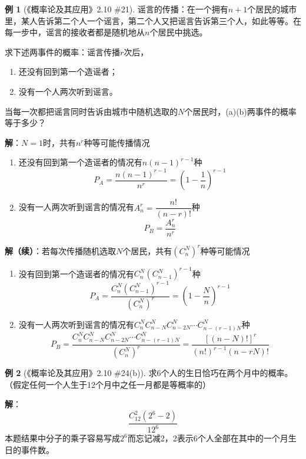 \documentclass[11pt,a4paper]{report}
\theoremstyle{definition}
\newtheorem{example}{例}[chapter]
\theoremstyle{plain}
\begin{document}
\begin{example}[《概率论及其应用》2.10 \#21]
谣言的传播：在一个拥有$n+1$个居民的城市里，某人告诉第二个人一个谣言，第二个人又把谣言告诉第三个人，如此等等。在每一步中，谣言的接收者都是随机地从$n$个居民中挑选。

求下述两事件的概率：谣言传播$r$次后，
\begin{enumerate}[label=(\alph*)]
    \item 还没有回到第一个造谣者；
    \item 没有一个人两次听到谣言。
\end{enumerate}

当每一次都把谣言同时告诉由城市中随机选取的$N$个居民时，(a)(b)两事件的概率等于多少？

\textbf{解}：$N=1$时，共有$n^r$种等可能传播情况
\begin{enumerate}[label=(\alph*)]
    \item 还没有回到第一个造谣者的情况有$n(n-1)^{r-1}$种
    \[
    P_A=\frac{n(n-1)^{r-1}}{n^r}=\left(1-\frac{1}{n}\right)^{r-1}
    \]
    \item 没有一人两次听到谣言的情况有$A_n^r=\dfrac{n!}{(n-r)!}$种
    \[
    P_B=\frac{A_n^r}{n^r}
    \]
\end{enumerate}

\textbf{解（续）}：若每次传播随机选取$N$个居民，共有$(C_n^N)^r$种等可能情况
\begin{enumerate}[label=(\alph*)]
    \item 没有回到第一个造谣者的情况有$C_n^N(C_{n-1}^N)^{r-1}$种
    \[
    P_A=\frac{C_n^N(C_{n-1}^N)^{r-1}}{(C_n^N)^r}=\left(1-\frac{N}{n}\right)^{r-1}
    \]
    \item 没有一人两次听到谣言的情况有$C_n^NC_{n-N}^NC_{n-2N}^N\cdots C_{n-(r-1)N}^N$种
    \[
    P_B=\frac{C_n^NC_{n-N}^NC_{n-2N}^N\cdots C_{n-(r-1)N}^N}{(C_n^N)^r}=\frac{[(n-N)!]^r}{(n!)^{r-1} (n-rN)!}
    \]
\end{enumerate}
\end{example}

\begin{example}[《概率论及其应用》2.10 \#24(b)]
求6个人的生日恰巧在两个月中的概率。（假定任何一个人生于12个月中之任一月都是等概率的）

\textbf{解}：
\[
\frac{C_{12}^2(2^6-2)}{12^6}
\]
本题结果中分子的乘子容易写成$2^6$而忘记减2，2表示6个人全部在其中的一个月生日的事件数。
\end{example}
\end{document}
